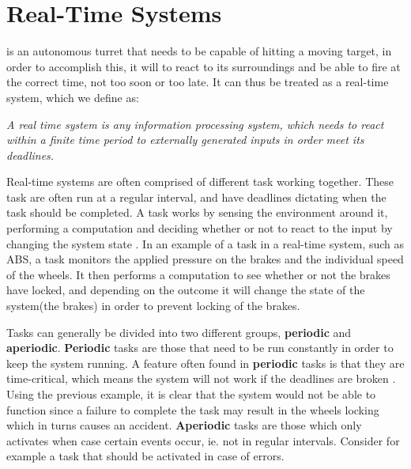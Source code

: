 \section{Real-Time Systems}\label{rts}

\name is an autonomous turret that needs to be capable of hitting a moving
target, in order to accomplish this, it will to react to its surroundings and
be able to fire at the correct time, not too soon or too late. It can thus be
treated as a real-time system, which we define as:


\begin{center}
\begin{minipage}{0.8\linewidth}
\textit{A real time system is any information processing system, which needs to
react within a finite time period to externally generated inputs in order meet
its deadlines.}
\end{minipage}
\end{center}

Real-time systems are often comprised of different task working together. These
task are often run at a regular interval, and have deadlines dictating when the
task should be completed. A task works by sensing the environment around it,
performing a computation and deciding whether or not to react to the input by
changing the system state \citep[Section 1a]{Realtime}. In an example of a task in a
real-time system, such as ABS, a task monitors the applied pressure on the brakes and the individual
speed of the wheels. It then performs a computation to see whether or not the
brakes have locked, and depending on the outcome it will change the state of the
system(the brakes) in order to prevent locking of the brakes.\nl

Tasks can generally be divided into two different groups, \textbf{periodic} and
\textbf{aperiodic}. \textbf{Periodic} tasks are those that need to be run
constantly in order to keep the system running. A feature often found in
\textbf{periodic} tasks is that they are time-critical, which means the system
will not work if the deadlines are broken \citep[Section 1a]{Realtime}. Using the
previous example, it is clear that the system would not be able to function since a failure to complete
the task may result in the wheels locking which in turns causes an accident.
\textbf{Aperiodic} tasks are those which only activates when case certain events
occur, ie. not in regular intervals. Consider for example a task that should
be activated in case of errors.\nl

